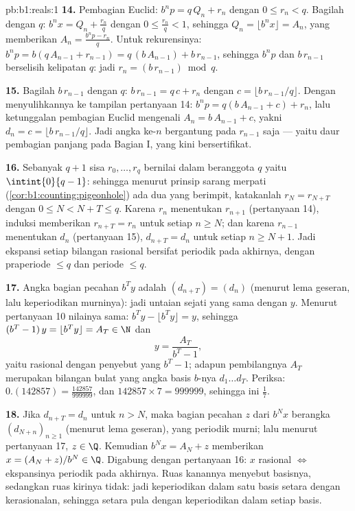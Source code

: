 \begin{solution}{pb:b1:reals:1}
\textbf{14.} Pembagian Euclid: $b^n p = q\,Q_n + r_n$ dengan $0
\leq r_n < q$. Bagilah dengan $q$: $b^n x = Q_n + \frac{r_n}{q}$ dengan
$0 \leq \frac{r_n}{q} < 1$, sehingga $Q_n = \lfloor b^n x \rfloor =
A_n$, yang memberikan $A_n = \frac{b^n p - r_n}{q}$. Untuk rekurensinya:
$b^n p = b(q\,A_{n-1} + r_{n-1}) = q\,(b\,A_{n-1}) +
b\,r_{n-1}$, sehingga $b^n p$ dan $b\,r_{n-1}$ berselisih kelipatan
$q$: jadi $r_n = (b\,r_{n-1}) \bmod q$.

\textbf{15.} Bagilah $b\,r_{n-1}$ dengan $q$: $b\,r_{n-1} = q\,c +
r_n$ dengan $c = \lfloor b\,r_{n-1}/q \rfloor$. Dengan menyulihkannya ke
tampilan pertanyaan 14: $b^n p = q(b\,A_{n-1} + c) + r_n$,
lalu ketunggalan pembagian Euclid mengenali $A_n = b\,A_{n-1}
+ c$, yakni $d_n = c = \lfloor b\,r_{n-1}/q \rfloor$. Jadi angka
ke-$n$ bergantung pada $r_{n-1}$ saja --- yaitu daur pembagian panjang pada Bagian
I, yang kini bersertifikat.

\textbf{16.} Sebanyak $q + 1$ sisa $r_0, \dots, r_q$ bernilai
dalam  beranggota $q$ yaitu $\intint{0}{q-1}$: sehingga menurut prinsip sarang
merpati (\cref{cor:b1:counting:pigeonhole}) ada dua yang berimpit, katakanlah
$r_N = r_{N+T}$ dengan $0 \leq N < N + T \leq q$. Karena $r_n$
menentukan $r_{n+1}$ (pertanyaan 14), induksi memberikan $r_{n+T} =
r_n$ untuk setiap $n \geq N$; dan karena $r_{n-1}$ menentukan $d_n$
(pertanyaan 15), $d_{n+T} = d_n$ untuk setiap $n \geq N + 1$. Jadi ekspansi setiap
bilangan rasional bersifat periodik pada akhirnya, dengan praperiode $\leq
q$ dan periode $\leq q$.

\textbf{17.} Angka bagian pecahan $b^T y$ adalah
$(d_{n+T}) = (d_n)$ (menurut lema geseran, lalu keperiodikan murninya): jadi
untaian sejati yang sama dengan $y$. Menurut pertanyaan 10 nilainya sama:
$b^T y - \lfloor b^T y \rfloor = y$, sehingga $(b^T - 1)\,y = \lfloor
b^T y \rfloor = A_T \in \N$ dan
\[
y = \frac{A_T}{b^T - 1} ,
\]
yaitu rasional dengan penyebut yang  $b^T - 1$; adapun pembilangnya $A_T$
merupakan bilangan bulat yang angka basis $b$-nya $d_1 \dots d_T$. Periksa:
$0.(142857) = \frac{142857}{999999}$, dan $142857 \times 7 =
999999$, sehingga ini $\frac 17$.

\textbf{18.} Jika $d_{n+T} = d_n$ untuk $n > N$, maka bagian pecahan
$z$ dari $b^N x$ berangka $(d_{N+n})_{n\geq1}$ (menurut lema geseran),
yang periodik murni; lalu menurut pertanyaan 17, $z \in \Q$. Kemudian $b^N
x = A_N + z$ memberikan $x = (A_N + z)/b^N \in \Q$. Digabung dengan pertanyaan 16:
$x$ rasional $\iff$ ekspansinya periodik pada akhirnya. Ruas kanannya
menyebut basisnya, sedangkan ruas kirinya tidak: jadi keperiodikan dalam satu basis
setara dengan kerasionalan, sehingga setara pula dengan keperiodikan dalam setiap basis.


\end{solution}
